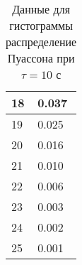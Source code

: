\documentclass[a4paper]{article}
\begin{document}
\begin{table}[!h]
\begin{center}
\begin{tabular}{|l|l|}
18                       & 0.037                                                                                  \\ \hline
19                       & 0.025                                                                                 \\ \hline
20                       & 0.016                                                                                 \\ \hline
21                       & 0.010                                                                                 \\ \hline
22                       & 0.006                                                                                   \\ \hline
23                       & 0.003                                                                                 \\ \hline
24                       & 0.002                                                                                 \\ \hline
25                       & 0.001                                                                                 \\ \hline

\end{tabular}
\caption{Данные для гистограммы распределение Пуассона при $\tau = 10$ с}
\end{center}
\end{table}
\end{document}
